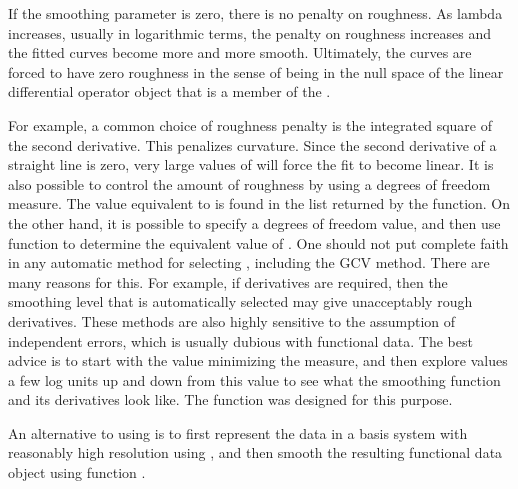 \begin{Details}\relax
If the smoothing parameter  is zero, there is no penalty
on roughness.  As lambda increases, usually in logarithmic terms, the
penalty on roughness increases and the fitted curves become more and
more smooth.  Ultimately, the curves are forced to have zero roughness
in the sense of being in the null space of the linear differential
operator object that is a member of the .

For example, a common choice of roughness penalty is the integrated
square of the second derivative.  This penalizes curvature.  Since the
second derivative of a straight line is zero, very large values of
 will force the fit to become linear.  It is also
possible to control the amount of roughness by using a degrees of
freedom measure.  The value equivalent to  is found in
the list returned by the function.  On the other hand, it is possible
to specify a degrees of freedom value, and then use function
 to determine the equivalent value of .
One should not put complete faith in any automatic method for
selecting , including the GCV method. There are many
reasons for this.  For example, if derivatives are required, then the
smoothing level that is automatically selected may give unacceptably
rough derivatives.  These methods are also highly sensitive to the
assumption of independent errors, which is usually dubious with
functional data.  The best advice is to start with the value
minimizing the  measure, and then explore 
values a few log units up and down from this value to see what the
smoothing function and its derivatives look like.  The function
 was designed for this purpose.

An alternative to using  is to first represent
the data in a basis system with reasonably high resolution using
, and then smooth the resulting functional data object
using function .
\end{Details}
